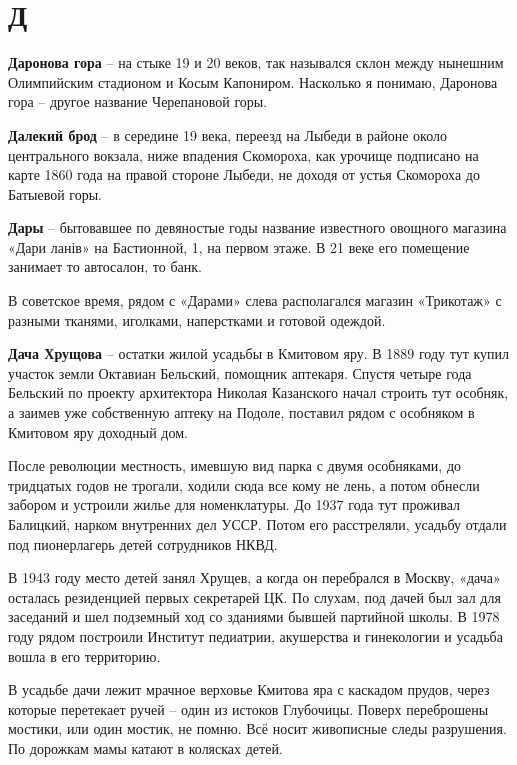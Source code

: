 \chapter*{Д}


\textbf{Даронова гора} – на стыке 19 и 20 веков, так назывался склон между нынешним Олимпийским стадионом и Косым Капониром. Насколько я понимаю, Даронова гора – другое название Черепановой горы.\\

\medskip


\textbf{Далекий брод} – в середине 19 века, переезд на Лыбеди в районе около центрального вокзала, ниже впадения Скомороха, как урочище подписано на карте 1860 года на правой стороне Лыбеди, не доходя от устья Скомороха до Батыевой горы.\\

\medskip

\textbf{Дары} – бытовавшее по девяностые годы название известного овощного магазина «Дари ланів» на Бастионной, 1, на первом этаже. В 21 веке его помещение занимает то автосалон, то банк.

В советское время, рядом с «Дарами» слева располагался магазин «Трикотаж» с разными тканями, иголками, наперстками и готовой одеждой.\\

\medskip

\textbf{Дача Хрущова} – остатки жилой усадьбы в Кмитовом яру. В 1889 году тут купил участок земли Октавиан Бельский, помощник аптекаря. Спустя четыре года Бельский по проекту архитектора Николая Казанского начал строить тут особняк, а заимев уже собственную аптеку на Подоле, поставил рядом с особняком в Кмитовом яру доходный дом.

После революции местность, имевшую вид парка с двумя особняками, до тридцатых годов не трогали, ходили сюда все кому не лень, а потом обнесли забором и устроили жилье для номенклатуры. До 1937 года тут проживал Балицкий, нарком внутренних дел УССР. Потом его расстреляли, усадьбу отдали под пионерлагерь детей сотрудников НКВД.

В 1943 году место детей занял Хрущев, а когда он перебрался в Москву, «дача» осталась резиденцией первых секретарей ЦК. По слухам, под дачей был зал для заседаний и шел подземный ход со зданиями бывшей партийной школы. В 1978 году рядом построили Институт педиатрии, акушерства и гинекологии и усадьба вошла в его территорию.

В усадьбе дачи лежит мрачное верховье Кмитова яра с каскадом прудов, через которые перетекает ручей – один из истоков Глубочицы. Поверх переброшены мостики, или один мостик, не помню. Всё носит живописные следы разрушения. По дорожкам мамы катают в колясках детей.\\

